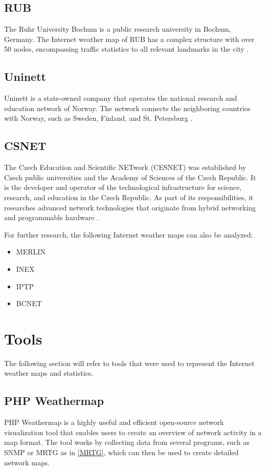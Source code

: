 \documentclass[sigconf,authorversion,nonacm]{acmart}
\begin{document}
\subsection{RUB}
The Ruhr University Bochum is a public research university in Bochum, Germany. The Internet weather map of RUB has a complex structure with over 50 nodes, encompassing traffic statistics to all relevant landmarks in the city \cite{rub}.
\subsection{Uninett}
Uninett is a state-owned company that operates the national research and education network of Norway. The network connects the neighboring countries with Norway, such as Sweden, Finland, and St. Petersburg \cite{Uninett}.
\subsection{CSNET}
The Czech Education and Scientific NETwork (CESNET) was established by Czech public universities and the Academy of Sciences of the Czech Republic. It is the developer and operator of the technological infrastructure for science, research, and education in the Czech Republic. As part of its responsibilities, it researches advanced network technologies that originate from hybrid networking and programmable hardware \cite{CESNET}.

For further research, the following Internet weather maps can also be analyzed: 
\begin{itemize}
    \item MERLIN \cite{merlin}
    \item INEX \cite{inex}
    \item IPTP \cite{iptp}
    \item BCNET \cite{Bcnet}
\end{itemize}
\section{Tools}
The following section will refer to tools that were used to represent the Internet weather maps and statistics.
\subsection{PHP Weathermap}

PHP Weathermap is a highly useful and efficient open-source network visualization tool that enables users to create an overview of network activity in a map format. The tool works by collecting data from several programs, such as SNMP or MRTG as in  \ref{MRTG}, which can then be used to create detailed network maps. 
\end{document}

